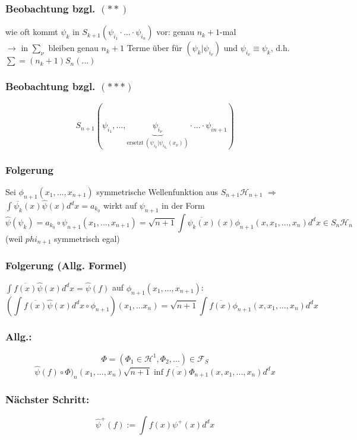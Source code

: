 \documentclass[twoside,a4paper]{scrartcl}
\renewcommand{\1}{\mathds{1}}
\newcommand{\Ra}{\Rightarrow}
\newcommand{\ra}{\rightarrow}
\renewcommand{\H}{\mathcal{H}}
\newcommand{\F}{\mathcal{F}}
\begin{document}
\subsubsection*{Beobachtung bzgl. $(**)$}
wie oft kommt $\psi_k$ in $S_{k+1}(\psi_{i_1}\cdot...\cdot\psi_{i_n})$ vor: genau $n_k+1$-mal\\
$\ra$ in $\sum_\nu$ bleiben genau $n_k+1$ Terme über für $(\psi_k|\psi_{i_\nu})$ und $\psi_{i_\nu} \equiv \psi_k$, d.h. $\sum=(n_k+1)S_n(...)$
\subsubsection*{Beobachtung bzgl. $(***)$}
$$S_{n+1}(\psi_{i_1},...,\underbrace{\psi_{i_\nu}}_{\mathrm{ersetzt} \ (\psi_{i_k}|\psi_{i_{k_\nu}}(x_\nu)) }\cdot ... \cdot \psi_{i{n+1}})$$
\subsubsection*{Folgerung}
Sei $\phi_{n+1}(x_1,...,x_{n+1})$ symmetrische Wellenfunktion aus $S_{n+1}\H_{n+1}$ $\Ra$ $\int \overline{\psi_{k}}(x)\hat \psi(x) d^dx=a_{k_0}$ wirkt auf $\psi_{n+1}$ in der Form 
$$\hat \psi(\psi_k)=a_{k_0} \circ \psi_{n+1} (x_1,...,x_{n+1})=\sqrt{n+1}\int \overline{\psi_k(x)}(x) \phi_{n+1}(x,x_1,...,x_n) d^dx \in S_n\H_n$$
(weil $phi_{n+1}$ symmetrisch egal)
\subsubsection*{Folgerung (Allg. Formel)}
$\int \overline{f(x)} \hat \psi(x)d^dx=\hat \psi (f)$ auf $\phi_{n+1}(x_1,...,x_{n+1})$:
$$(\int \overline{f(x)} \hat \psi(x)d^dx \circ \phi_{n+1})(x_1,...x_n)=\sqrt{n+1} \int \overline{f(x)} \phi_{n+1}(x,x_1,...,x_n)d^dx$$
\subsubsection*{Allg.:}
$$\Phi=(\Phi_1 \in \H^1,\Phi_2,...)\in \F_S$$
$$\hat \psi(f) \circ \Phi)_n(x_1,...,x_n)\sqrt{n+1}\inf \overline{f(x)} \Phi_{n+1}(x,x_1,...,x_n)d^dx$$
\subsubsection*{Nächster Schritt:}
$$\hat \psi^+(f):=\int f(x) \psi^+(x)d^dx$$
\end{document}
